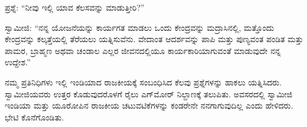  ಪ್ರಶ್ನೆ: “ನೀವು ಇಲ್ಲಿ ಯಾವ ಕೆಲಸವನ್ನು ಮಾಡುತ್ತೀರಿ?” 

 ಸ್ವಾಮೀಜಿ: “ನನ್ನ ಯೋಜನೆಯನ್ನು ಕಾರ್ಯಗತ ಮಾಡಲು ಒಂದು ಕೇಂದ್ರವನ್ನು ಮದ್ರಾಸಿನಲ್ಲಿ, ಮತ್ತೊಂದು ಕೇಂದ್ರವನ್ನು ಕಲ್ಕತ್ತೆಯಲ್ಲಿ ತೆರೆಯಲು ಯತ್ನಿಸುವೆನು. ವೇದಾಂತ ಆದರ್ಶವನ್ನು ಪಾಪಿ ಮತ್ತು ಪುಣ್ಯವಂತ ಪಂಡಿತ ಮತ್ತು ಪಾಮರ, ಬ್ರಾಹ್ಮಣ ಅಥವಾ ಚಂಡಾಲ ಎಲ್ಲರ ಜೀವನದಲ್ಲಿಯೂ ಕಾರ್ಯಕಾರಿಯಾಗುವಂತೆ ಮಾಡುವುದೇ ನನ್ನ ಉದ್ದೇಶ.” 

 ನಮ್ಮ ಪ್ರತಿನಿಧಿಗಳು ಇಲ್ಲಿ ಇಂಡಿಯಾದ ರಾಜಕೀಯಕ್ಕೆ ಸಂಬಂಧಿಸಿದ ಕೆಲವು ಪ್ರಶ್ನೆಗಳನ್ನು ಹಾಕಲು ಯತ್ನಿಸಿದರು. ಸ್ವಾಮೀಜಿಯವರು ಉತ್ತರ ಕೊಡುವುದರೊಳಗೆ ರೈಲು ಎಗ್‌ಮೋರ್ ನಿಲ್ದಾಣಕ್ಕೆ ತಲುಪಿತು. ಅವಸರದಲ್ಲಿ ಸ್ವಾಮೀಜಿ ಇಂಡಿಯಾ ಮತ್ತು ಯೂರೋಪಿನ ರಾಜಕೀಯ ಚಟುವಟಿಕೆಗಳನ್ನು ಕಂಡರೇನೇ ನನಗಾಗುವುದಿಲ್ಲ ಎಂದು ಹೇಳಿದರು. ಭೇಟಿ ಕೊನೆಗೊಂಡಿತು. 

